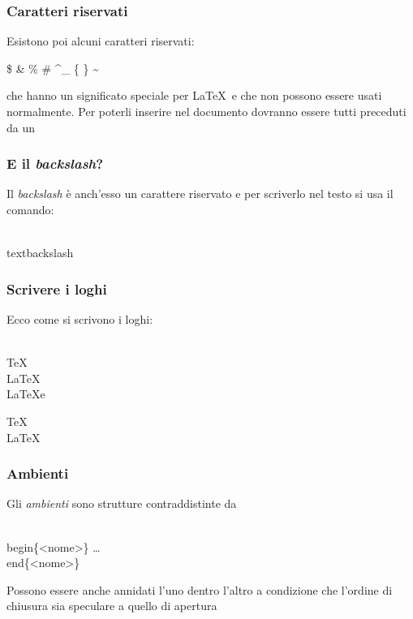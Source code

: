 \documentclass[10pt,svgnames,%
ucs,%
pdftex]{mybeamer}
\begin{document}
\begin{frame}
	\frametitle{Caratteri riservati}
	Esistono poi alcuni caratteri riservati:
	\begin{LaTeXcode}
		\$ \quad \& \quad \% \quad \# \quad \^ \quad \_ \quad \{ \quad \} \quad \~\null
	\end{LaTeXcode}
	\bigskip
	che hanno un significato speciale per \LaTeX\ e che non
	possono essere usati normalmente. Per poterli inserire nel 
	documento dovranno essere tutti preceduti da un \LCmd{} 
\end{frame}
\begin{frame}
	\frametitle{E il \textit{backslash}?}
	Il \textit{backslash} \`e anch'esso un carattere riservato e per
	scriverlo nel testo si usa il comando:	
	\begin{LaTeXcode}
		\\textbackslash
	\end{LaTeXcode}
\end{frame}
\begin{frame}
	\frametitle{Scrivere i loghi}
	Ecco come si scrivono i loghi:
	\begin{LaTeXcode}
		\\TeX\n
		\\LaTeX\n
		\\LaTeXe
	\end{LaTeXcode}
	\medskip
	\begin{LaTeXoutput}
		\TeX\\
		\LaTeX\\
		\LaTeXe
	\end{LaTeXoutput}
\end{frame}
\begin{frame}
	\frametitle{Ambienti}
	Gli \emph{ambienti} sono strutture contraddistinte da
	\begin{LaTeXcode}
		\\begin\{\alert{<nome>}\}\n
		\quad\dots\n
		\\end\{\alert{<nome>}\}
	\end{LaTeXcode}
	\medskip
	Possono essere anche annidati l'uno dentro l'altro a condizione che
	l'ordine di chiusura sia speculare a quello di apertura
\end{frame}
\end{document}
